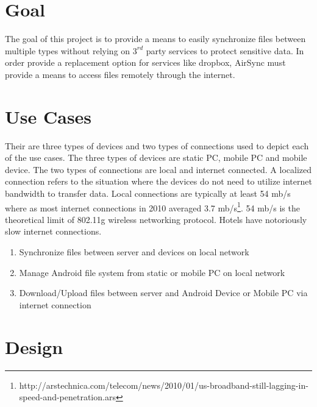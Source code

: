\documentclass[12pt,draft]{article}
\begin{document}
\section{Goal}

The goal of this project is to provide a means to easily synchronize files between multiple types without relying on $3^{rd}$ party services to protect sensitive data. In order provide a replacement option for services like dropbox, AirSync must provide a means to access files remotely through the internet.

\section {Use Cases}

Their are three types of devices and two types of connections used to depict each of the use cases.  The three types of devices are static PC, mobile PC and mobile device.  The two types of connections are local and internet connected. A localized connection refers to the situation where the devices do not need to utilize internet bandwidth to transfer data.  Local connections are typically at least 54 mb/s where as most internet connections in 2010 averaged 3.7 mb/s\footnote{http://arstechnica.com/telecom/news/2010/01/us-broadband-still-lagging-in-speed-and-penetration.ars}. 54 mb/s is the theoretical limit of 802.11g wireless networking protocol. Hotels have notoriously slow internet connections.

\begin{enumerate}
\item Synchronize files between server and devices on local network
\item Manage Android file system from static or mobile PC on local network
\item Download/Upload files between server and Android Device or Mobile PC via internet connection
\end{enumerate}

\section{Design}
\end{document}
